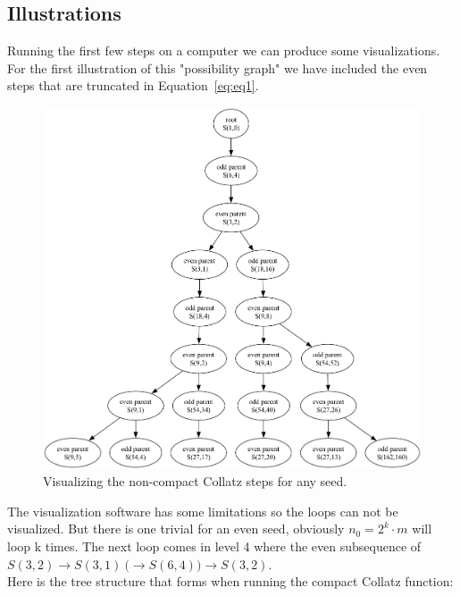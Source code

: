\documentclass{article}
\theoremstyle{definition}
\begin{document}
\subsection*{Illustrations}
Running the first few steps on a computer we can produce some visualizations. For the first illustration of this "possibility graph" we have included the even steps that are truncated in Equation~\ref{eq:eq1}.
\begin{figure}[H]
\begin{center} 
\includegraphics[width=1.0\textwidth]{tree.png}
\caption{Visualizing the non-compact Collatz steps for any seed.}
\label{fig:fig1}
\end{center}
\end{figure}
%
\noindent
The visualization software has some limitations so the loops can not be visualized. But there is one trivial for an even seed, obviously $n_0=2^k\cdot m$ will loop k times. The next loop comes in level 4 where the even subsequence of $S(3,2) \longrightarrow S(3,1) \ \big(\longrightarrow S(6,4)\big) \longrightarrow S(3,2)$.
%
\\[.4cm]
%
Here is the tree structure that forms when running the compact Collatz function:
\end{document}
